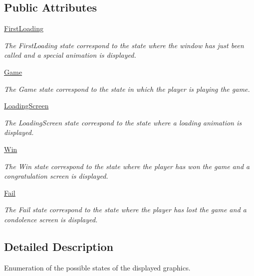 \subsection*{Public Attributes}
\begin{DoxyCompactItemize}
\item 
\hyperlink{enumwindow_1_1_window_state_a56269b4774b71a1dcba9e5e9cefb495e}{First\-Loading}
\begin{DoxyCompactList}\small\item\em The First\-Loading state correspond to the state where the window has just been called and a special animation is displayed. \end{DoxyCompactList}\item 
\hyperlink{enumwindow_1_1_window_state_abb4a2512f88d7104f91993174488282d}{Game}
\begin{DoxyCompactList}\small\item\em The Game state correspond to the state in which the player is playing the game. \end{DoxyCompactList}\item 
\hyperlink{enumwindow_1_1_window_state_a281f52964a4be64ea19bf2a401184521}{Loading\-Screen}
\begin{DoxyCompactList}\small\item\em The Loading\-Screen state correspond to the state where a loading animation is displayed. \end{DoxyCompactList}\item 
\hyperlink{enumwindow_1_1_window_state_adfd70a04c81f1ff3b289d5b766206fb5}{Win}
\begin{DoxyCompactList}\small\item\em The Win state correspond to the state where the player has won the game and a congratulation screen is displayed. \end{DoxyCompactList}\item 
\hyperlink{enumwindow_1_1_window_state_ace96026e75eb5118b66e8703fd93d68c}{Fail}
\begin{DoxyCompactList}\small\item\em The Fail state correspond to the state where the player has lost the game and a condolence screen is displayed. \end{DoxyCompactList}\end{DoxyCompactItemize}


\subsection{Detailed Description}
Enumeration of the possible states of the displayed graphics. 

